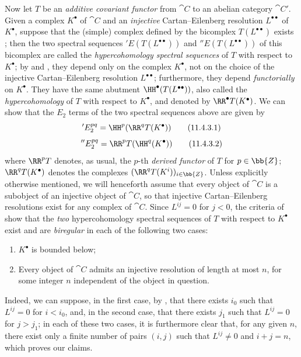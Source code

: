 \begin{env}[11.4.3]
\label{0.11.4.3}
Now let $T$ be an \emph{additive covariant functor} from $\cat{C}$ to an abelian category $\cat{C'}$.
Given a complex $K^\bullet$ of $\cat{C}$ and an \emph{injective} Cartan--Eilenberg resolution $L^{\bullet\bullet}$ of $K^{\bullet}$, suppose that the (simple) complex defined by the bicomplex $T(L^{\bullet\bullet})$ exists ;
then the two spectral sequences $'E(T(L^{\bullet\bullet}))$ and $''E(T(L^{\bullet\bullet}))$ of this bicomplex are called the \emph{hypercohomology spectral sequences} of $T$ with respect to $K^\bullet$;
by  and , they depend only on the complex $K^\bullet$, not on the choice of the injective Cartan--Eilenberg resolution $L^{\bullet\bullet}$;
furthermore, they depend \emph{functorially} on $K^\bullet$.
They have the same abutment $\HH^\bullet(T(L^{\bullet\bullet}))$, also called the \emph{hypercohomology} of $T$ with respect to $K^\bullet$, and denoted by $\RR^\bullet T(K^\bullet)$.
We can show that the $E_2$ terms of the two spectral sequences above are given by 
\[
\label{0.11.4.3.1}
  'E_2^{pq}
  = \HH^p(\RR^q T(K^\bullet))
\tag{11.4.3.1}
\]
\[
\label{0.11.4.3.2}
  ''E_2^{pq}
  = \RR^p T(\HH^q(K^\bullet))
\tag{11.4.3.2}
\]
where $\RR^p T$ denotes, as usual, the $p$-th \emph{derived functor} of $T$ for $p\in\bb{Z}$;
$\RR^q T(K^\bullet)$ denotes the complexes $(\RR^q T(K^i))_{i\in\bb{Z}}$.
\label{0.11.4.4}
Unless explicitly otherwise mentioned, we will henceforth assume that every object of $\cat{C}$ is a subobject of an injective object of $\cat{C}$, so that injective Cartan--Eilenberg resolutions exist for any complex of $\cat{C}$.
Since $L^{ij}=0$ for $j<0$, the criteria of  show that the \emph{two} hypercohomology spectral sequences of $T$ with respect to $K^\bullet$ exist and are \emph{biregular} in each of the following two cases:
\begin{enumerate}
  \item $K^\bullet$ is bounded below;
  \item Every object of $\cat{C}$ admits an injective resolution of length at most $n$, for some integer $n$ independent of the object in question.
\end{enumerate}
Indeed, we can suppose, in the first case, by , that there exists $i_0$ such that $L^{ij}=0$ for $i<i_0$, and, in the second case, that there exists $j_1$ such that $L^{ij}=0$ for $j>j_1$;
in each of these two cases, it is furthermore clear that, for any given $n$, there exist only a finite number of pairs $(i,j)$ such that $L^{ij}\neq 0$ and $i+j=n$, which proves our claims.


\end{env}
